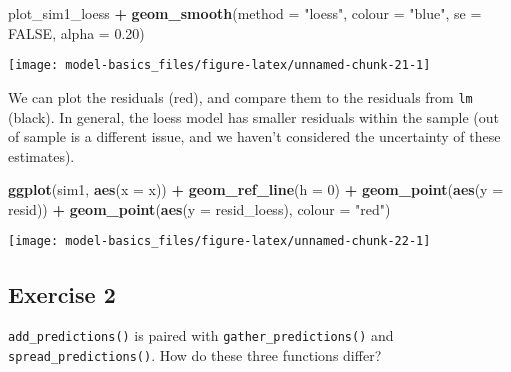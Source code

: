 \documentclass[]{book}
\newenvironment{Shaded}{\begin{snugshade}}{\end{snugshade}}
\newcommand{\DataTypeTok}[1]{\textcolor[rgb]{0.13,0.29,0.53}{#1}}
\newcommand{\DecValTok}[1]{\textcolor[rgb]{0.00,0.00,0.81}{#1}}
\newcommand{\FloatTok}[1]{\textcolor[rgb]{0.00,0.00,0.81}{#1}}
\newcommand{\KeywordTok}[1]{\textcolor[rgb]{0.13,0.29,0.53}{\textbf{#1}}}
\newcommand{\NormalTok}[1]{#1}
\newcommand{\OperatorTok}[1]{\textcolor[rgb]{0.81,0.36,0.00}{\textbf{#1}}}
\newcommand{\OtherTok}[1]{\textcolor[rgb]{0.56,0.35,0.01}{#1}}
\newcommand{\StringTok}[1]{\textcolor[rgb]{0.31,0.60,0.02}{#1}}
\theoremstyle{definition}
\theoremstyle{definition}
\theoremstyle{definition}
\theoremstyle{remark}
\begin{document}
\begin{Shaded}
\begin{Highlighting}[]
\NormalTok{plot_sim1_loess }\OperatorTok{+}
\StringTok{  }\KeywordTok{geom_smooth}\NormalTok{(}\DataTypeTok{method =} \StringTok{"loess"}\NormalTok{, }\DataTypeTok{colour =} \StringTok{"blue"}\NormalTok{, }\DataTypeTok{se =} \OtherTok{FALSE}\NormalTok{, }\DataTypeTok{alpha =} \FloatTok{0.20}\NormalTok{)}
\end{Highlighting}
\end{Shaded}

\begin{center}\texttt{[image: model-basics\_files/figure-latex/unnamed-chunk-21-1]} \end{center}

We can plot the residuals (red), and compare them to the residuals from
\texttt{lm} (black). In general, the loess model has smaller residuals
within the sample (out of sample is a different issue, and we haven't
considered the uncertainty of these estimates).

\begin{Shaded}
\begin{Highlighting}[]
\KeywordTok{ggplot}\NormalTok{(sim1, }\KeywordTok{aes}\NormalTok{(}\DataTypeTok{x =}\NormalTok{ x)) }\OperatorTok{+}
\StringTok{  }\KeywordTok{geom_ref_line}\NormalTok{(}\DataTypeTok{h =} \DecValTok{0}\NormalTok{) }\OperatorTok{+}
\StringTok{  }\KeywordTok{geom_point}\NormalTok{(}\KeywordTok{aes}\NormalTok{(}\DataTypeTok{y =}\NormalTok{ resid)) }\OperatorTok{+}
\StringTok{  }\KeywordTok{geom_point}\NormalTok{(}\KeywordTok{aes}\NormalTok{(}\DataTypeTok{y =}\NormalTok{ resid_loess), }\DataTypeTok{colour =} \StringTok{"red"}\NormalTok{)}
\end{Highlighting}
\end{Shaded}

\begin{center}\texttt{[image: model-basics\_files/figure-latex/unnamed-chunk-22-1]} \end{center}

\hypertarget{exercise-2-57}{%
\subsection{Exercise 2}\label{exercise-2-57}}

\texttt{add\_predictions()} is paired with
\texttt{gather\_predictions()} and \texttt{spread\_predictions()}. How
do these three functions differ?
\end{document}
